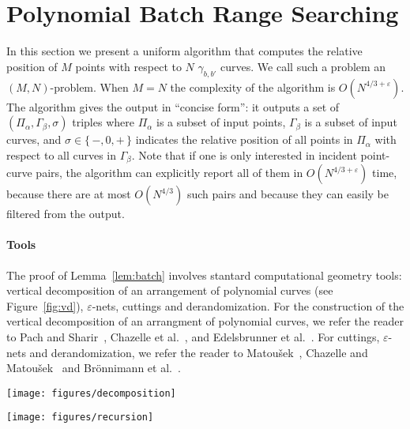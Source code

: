 \section{Polynomial Batch Range Searching}%
\label{sec:algo:point-curves-location}

In this section we present a uniform algorithm that computes the relative
position of \(M\) points with respect to \(N\) $\gamma_{b,b'}$ curves. We call
such a problem an \((M,N)\)-problem. When \(M=N\) the complexity of the
algorithm is \(O(N^{4/3+\varepsilon})\).
The algorithm gives the output in ``concise form'':
it outputs a set of $(\Pi_\alpha, \Gamma_\beta, \sigma)$ triples where
$\Pi_\alpha$ is a subset of input points, $\Gamma_\beta$ is a subset of input curves, and $\sigma \in
\{\,-,0,+\,\}$ indicates the relative position of all points in $\Pi_\alpha$ with
respect to all curves in $\Gamma_\beta$.
Note that if one is only interested in incident point-curve pairs, the
algorithm can explicitly report all of them in
$O(N^{4/3+\varepsilon})$ time, because there are at most $O(N^{4/3})$
such pairs and because they can easily be filtered from the output.

\paragraph{Tools} The proof of Lemma~\ref{lem:batch} involves stantard
computational geometry tools: vertical decomposition of an
arrangement of polynomial curves (see Figure~\ref{fig:vd}),
$\varepsilon$-nets, cuttings and derandomization.
For the construction of the vertical
decomposition of an arrangment of polynomial curves, we refer the reader to
Pach and Sharir~\cite{Alcala}, Chazelle et al.~\cite{CEGS91}, and Edelsbrunner
et al.~\cite{EGPPSS92}. For cuttings, $\varepsilon$-nets and derandomization, we
refer the reader to Matou\v{s}ek~\cite{M95,M96}, Chazelle and
Matou\v{s}ek~\cite{CM96} and Brönnimann et al.~\cite{BCM99}.
\begin{figure*}
    \centering
    \texttt{[image: figures/decomposition]}
    \caption{Some curves in $\mathbb{R}^2$.}
    \label{fig:some-curves-in-R2}
\end{figure*}
\begin{figure*}
    \centering
    \texttt{[image: figures/recursion]}
    \caption{Vertical decomposition of the curves in Figure~\ref{fig:some-curves-in-R2}.}%
    \label{fig:vd}
\end{figure*}

